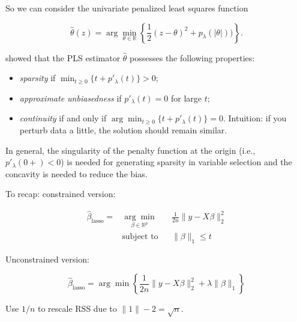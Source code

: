 So we can consider the univariate penalized least squares function

\[
\hat{\theta}(z) = \arg \min_{\theta \in \mathbb{R}} \left\{ \frac{1}{2}(z - \theta)^2 + p_\lambda(|\theta|)) \right\}.
\]

\citet{Antoniadis2001} showed that the PLS estimator \(\hat{\theta}\) possesses the following properties:

\begin{itemize}

\item \textit{sparsity} if \(\min_{t \geq 0} \{t + p'_\lambda (t) \} > 0\);

\item \textit{approximate unbiasedness} if \(p'_\lambda(t) = 0\) for large \(t\);

\item \textit{continuity} if and only if \(\arg \min_{t \geq 0} \{t + p'_\lambda(t) \} = 0\). Intuition: if you perturb data a little, the solution should remain similar. 

\end{itemize}

In general, the singularity of the penalty function at the origin (i.e., \(p'_\lambda(0+) < 0\)) is needed for generating sparsity in variable selection and the concavity is needed to reduce the bias. 

To recap: constrained version:


\[
\begin{aligned}
\hat{\beta}_{\text{lasso}} =  & {\underset {\beta \in \mathbb{R}^p}{\arg \min}}
& &\frac{1}{2n} \lVert y - X \beta \rVert_2^2  \\
& \text{subject to}
& & \lVert \beta \rVert_1 \leq t 
\end{aligned}
\]

Unconstrained version:

\[
\hat{\beta}_{\text{lasso}} = \arg \min \left\{ \frac{1}{2n} \lVert y - X \beta \rVert_2^2 + \lambda \lVert \beta \rVert_1 \right\}
\]

Use \(1/n\) to rescale RSS due to \(\lVert 1 \rVert-2 = \sqrt{n}\).

